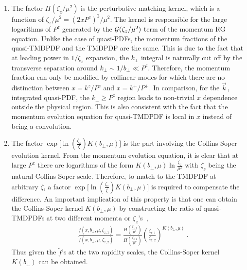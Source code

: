 \documentclass[aps,rmp,reprint,amsmath,amssymb,graphicx,longbibliography]{revtex4-1} %
\begin{document}
\begin{enumerate}
	\item The factor $ H(\zeta_z/\mu^2)$ is the perturbative matching kernel, which is a function of $\zeta_z/\mu^2=(2xP^z)^2/\mu^2$. The kernel is responsible for the large logarithms of $P^z$ generated by the ${\cal G}(\zeta_z/\mu^2)$ term of the momentum RG equation. Unlike the case of quasi-PDFs, the momentum fractions of the quasi-TMDPDF and the TMDPDF are the same. This is due to the fact that at leading power in $1/\zeta_z$ expansion, the $k_\perp$ integral is naturally cut off by the transverse separation around $k_\perp \sim 1/b_\perp \ll P^z$. Therefore, the momentum fraction can only be modified by collinear modes for which there are no distinction between $x=k^z/P^z$ and $x=k^+/P^+$. In comparison, for the $\vec{k}_\perp$ integrated quasi-PDF, the $k_\perp \ge P^z$ region leads to non-trivial $x$ dependence outside the physical region. This is also consistent with the fact that the momentum evolution equation for quasi-TMDPDF is local in $x$ instead of being a convolution.
	\item The factor $\exp\big[\ln (\frac{\zeta_z}{\zeta})K(b_\perp,\mu)\big]$ is the part involving the Collins-Soper evolution kernel. From the momentum evolution equation, it is clear that at large $P^z$ there are logarithms of the form $K(b_\perp,\mu)\ln \frac{\zeta_z}{\mu^2}  $ with $\zeta_z$ being the natural Collins-Soper scale. Therefore, to match to the TMDPDF at arbitrary $\zeta$, a factor $\exp\big[\ln (\frac{\zeta_z}{\zeta})K(b_\perp,\mu)\big]$ is required to compensate the difference. An important implication of this property is that one can obtain the Collins-Soper kernel $K(b_\perp,\mu)$ by constructing the ratio of quasi-TMDPDFs at two different momenta or $\zeta_z$'s~\cite{Ebert:2018gzl},
	\begin{align}
		\label{eq:TMD-CS_kernel}
		\ \ \quad\frac{\tilde f(x,b_\perp,\mu,\zeta_{z,1})}{\tilde f(x,b_\perp,\mu,\zeta_{z,2})}=\frac{H\left(\frac{\zeta_{z,2}}{\mu^2}\right)}{H\left(\frac{\zeta_{z,1}}{\mu^2}\right)}\left(\frac{\zeta_{z,1}}{\zeta_{z,2}}\right)^{K(b_\perp,\mu)} \ .
	\end{align}
	Thus given the $\tilde f$'s at the two rapidity scales, the Collins-Soper kernel $K(b_\perp)$ can be obtained.
	
\end{enumerate}
\end{document}
